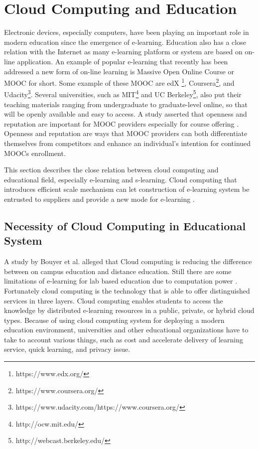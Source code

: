 \documentclass[journal]{vgtc}
\begin{document}
\section{Cloud Computing and Education}
Electronic devices, especially computers, have been playing an important role in modern education since the emergence of e-learning. Education also has a close relation with the Internet as many e-learning platform or system are based on on-line application. An example of popular e-learning that recently has been addressed a new form of on-line learning is Massive Open Online Course or MOOC for short\cite{Margaryan2014}. Some example of these MOOC are edX \footnote{https://www.edx.org/}, Coursera\footnote{https://www.coursera.org/}, and Udacity\footnote{https://www.udacity.com/https://www.coursera.org/}. Several universities, such as MIT\footnote{http://ocw.mit.edu/} and UC Berkeley\footnote{http://webcast.berkeley.edu/}, also put their teaching materials ranging from undergraduate to graduate-level online, so that will be openly available and easy to access. A study asserted that openness and reputation are important for MOOC providers especially for course offering \cite{Alraimi2014}. Openness and reputation are ways that MOOC providers can both differentiate themselves from competitors and enhance an individual's intention for continued MOOCs enrollment.

This section describes the close relation between cloud computing and educational field, especially e-learning and s-learning. Cloud computing that introduces efficient scale mechanism can let construction of e-learning system be entrusted to suppliers and provide a new mode for e-learning \cite{Laisheng2011}.

  \subsection{Necessity of Cloud Computing in Educational System}
  A study by Bouyer et al. \cite{Bouyer2014} alleged that Cloud computing is reducing the difference between on campus education and distance education. Still there are some limitations of e-learning for lab based education due to computation power \cite{Bouyer2014}. Fortunately cloud computing is the technology that is able to offer distinguished services in three layers. Cloud computing enables students to access the knowledge by distributed e-learning resources in a public, private, or hybrid cloud types. Because of using cloud computing system for deploying a modern education environment, universities and other educational organizations have to take to account various things, such as cost and accelerate delivery of learning service, quick learning, and privacy issue.
\end{document}
